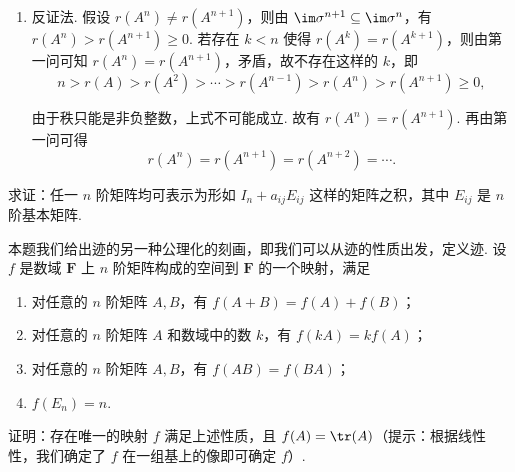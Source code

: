 \begin{exercise}
\begin{exgroup}
\begin{answer}
\begin{enumerate}
                \item 反证法. 假设 $r(A^n) \neq r(A^{n+1})$，则由 $\im \sigma^{n+1} \subseteq \im \sigma^n$，有 $r(A^n) > r(A^{n+1}) \geqslant 0$.
                    若存在 $k < n$ 使得 $r(A^k) = r(A^{k+1})$，则由第一问可知 $r(A^n) = r(A^{n+1})$，矛盾，故不存在这样的 $k$，即
                    \[
                        n > r(A) > r(A^2) > \cdots > r(A^{n-1}) > r(A^n) > r(A^{n+1}) \geqslant 0,
                    \]

                    由于秩只能是非负整数，上式不可能成立. 故有 $r(A^n) = r(A^{n+1})$. 再由第一问可得
                    \[
                        r(A^n) = r(A^{n+1}) = r(A^{n+2}) = \cdots.
                    \]

            \end{enumerate}
        \end{answer}
    \end{exgroup}

    \begin{exgroup}
        \item 求证：任一 $n$ 阶矩阵均可表示为形如 $I_n + a_{ij}E_{ij}$ 这样的矩阵之积，其中 $E_{ij}$ 是 $n$ 阶基本矩阵.
        \begin{answer}

        \end{answer}

        \item 本题我们给出迹的另一种公理化的刻画，即我们可以从迹的性质出发，定义迹. 设 $f$ 是数域 $\mathbf{F}$ 上 $n$ 阶矩阵构成的空间到 $\mathbf{F}$ 的一个映射，满足
        \begin{enumerate}
            \item 对任意的 $n$ 阶矩阵 $A, B$，有 $f(A+B) = f(A) + f(B)$；
            \item 对任意的 $n$ 阶矩阵 $A$ 和数域中的数 $k$，有 $f(kA) = kf(A)$；
            \item 对任意的 $n$ 阶矩阵 $A, B$，有 $f(AB) = f(BA)$；
            \item $f(E_n) = n$.
        \end{enumerate}
        证明：存在唯一的映射 $f$ 满足上述性质，且 $f(A) = \tr(A)$（提示：根据线性性，我们确定了 $f$ 在一组基上的像即可确定 $f$）.
        \begin{answer}

        \end{answer}


\end{exgroup}
\end{exercise}
